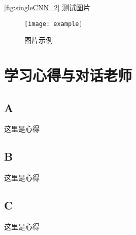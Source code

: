 \documentclass[UTF8,9pt]{ctexart}  %
\begin{document}
	\autoref{fig:singleCNN_2} 测试图片
	
	\begin{figure}[htb]
		\texttt{[image: example]}
		\caption{图片示例}
		\label{fig:singleCNN_2}
	\end{figure}



	\section{学习心得与对话老师}
	\subsection{A}
	这里是心得
	\subsection{B}
	这里是心得
	\subsection{C}
	这里是心得
	

\printbibliography[heading=bibintoc]%
\end{document}
